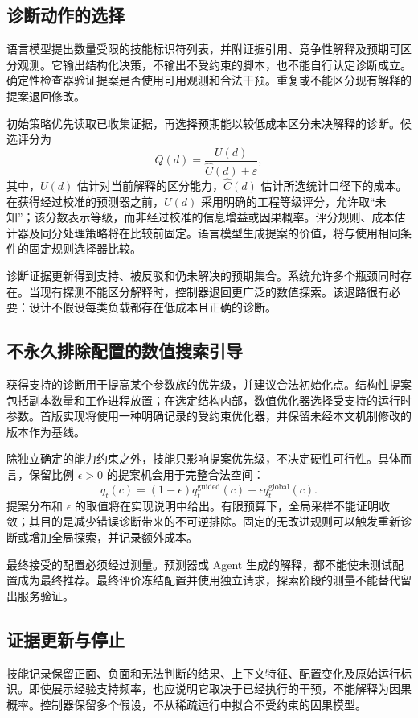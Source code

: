 \documentclass[UTF8,11pt,a4paper,fontset=windows]{ctexart}
\begin{document}
\subsection{诊断动作的选择}
语言模型提出数量受限的技能标识符列表，并附证据引用、竞争性解释及预期可区分观测。它输出结构化决策，不输出不受约束的脚本，也不能自行认定诊断成立。确定性检查器验证提案是否使用可用观测和合法干预。重复或不能区分现有解释的提案退回修改。

初始策略优先读取已收集证据，再选择预期能以较低成本区分未决解释的诊断。候选评分为
\begin{equation}
 Q(d)=\frac{U(d)}{\widehat C(d)+\varepsilon},
\end{equation}
其中，$U(d)$ 估计对当前解释的区分能力，$\widehat C(d)$ 估计所选统计口径下的成本。在获得经过校准的预测器之前，$U(d)$ 采用明确的工程等级评分，允许取“未知”；该分数表示等级，而非经过校准的信息增益或因果概率。评分规则、成本估计器及同分处理策略将在比较前固定。语言模型生成提案的价值，将与使用相同条件的固定规则选择器比较。

诊断证据更新得到支持、被反驳和仍未解决的预期集合。系统允许多个瓶颈同时存在。当现有探测不能区分解释时，控制器退回更广泛的数值探索。该退路很有必要：设计不假设每类负载都存在低成本且正确的诊断。

\subsection{不永久排除配置的数值搜索引导}
获得支持的诊断用于提高某个参数族的优先级，并建议合法初始化点。结构性提案包括副本数量和工作进程放置；在选定结构内部，数值优化器选择受支持的运行时参数。首版实现将使用一种明确记录的受约束优化器，并保留未经本文机制修改的版本作为基线。

除独立确定的能力约束之外，技能只影响提案优先级，不决定硬性可行性。具体而言，保留比例 $\epsilon>0$ 的提案机会用于完整合法空间：
\begin{equation}
 q_t(c)=(1-\epsilon)q_t^{\mathrm{guided}}(c)
                 +\epsilon q_t^{\mathrm{global}}(c).
\end{equation}
提案分布和 $\epsilon$ 的取值将在实现说明中给出。有限预算下，全局采样不能证明收敛；其目的是减少错误诊断带来的不可逆排除。固定的无改进规则可以触发重新诊断或增加全局探索，并记录额外成本。

最终接受的配置必须经过测量。预测器或 Agent 生成的解释，都不能使未测试配置成为最终推荐。最终评价冻结配置并使用独立请求，探索阶段的测量不能替代留出服务验证。

\subsection{证据更新与停止}
技能记录保留正面、负面和无法判断的结果、上下文特征、配置变化及原始运行标识。即使展示经验支持频率，也应说明它取决于已经执行的干预，不能解释为因果概率。控制器保留多个假设，不从稀疏运行中拟合不受约束的因果模型。
\end{document}

